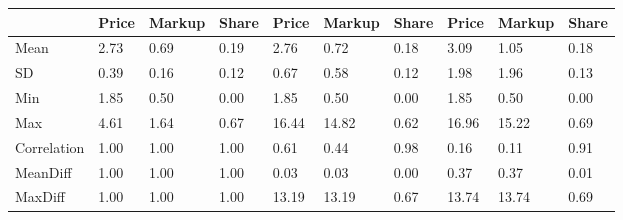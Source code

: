 \begin{table}[htbp]
\begin{tabular}{llllllllll} \hline \hline
 & Price  & Markup  & Share  & Price  & Markup  & Share  & Price  & Markup  & Share  \\  \hline 
Mean &      2.73 &      0.69 &      0.19 &      2.76 &      0.72 &      0.18 &      3.09 &      1.05 &      0.18 \\  
SD &      0.39 &      0.16 &      0.12 &      0.67 &      0.58 &      0.12 &      1.98 &      1.96 &      0.13 \\  
Min &      1.85 &      0.50 &      0.00 &      1.85 &      0.50 &      0.00 &      1.85 &      0.50 &      0.00 \\  
Max &      4.61 &      1.64 &      0.67 &     16.44 &     14.82 &      0.62 &     16.96 &     15.22 &      0.69 \\  
Correlation &      1.00 &      1.00 &      1.00 &      0.61 &      0.44 &      0.98 &      0.16 &      0.11 &      0.91 \\  
MeanDiff &      1.00 &      1.00 &      1.00 &      0.03 &      0.03 &      0.00 &      0.37 &      0.37 &      0.01 \\  
MaxDiff &      1.00 &      1.00 &      1.00 &     13.19 &     13.19 &      0.67 &     13.74 &     13.74 &      0.69 \\  
\hline \hline \end{tabular}
\end{table}
